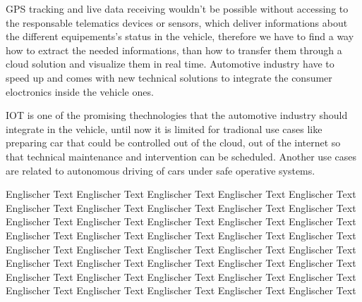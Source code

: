 GPS tracking and live data receiving wouldn't be possible without accessing to the responsable telematics devices or sensors, which deliver informations about the different equipements's status in the vehicle, therefore we have to find a way how to extract the needed informations, than how to transfer them through a cloud solution and visualize them in real time.
Automotive industry have to speed up and comes with new technical solutions to integrate the consumer eloctronics inside the vehicle ones.

IOT is one of the promising thechnologies that the automotive industry should integrate in the vehicle, until now it is limited for tradional use cases like preparing car that could be controlled out of the cloud, out of the internet so that technical maintenance and intervention can be scheduled. Another use cases are related to autonomous driving of cars under safe operative systems.

 

        Englischer Text Englischer Text Englischer Text Englischer Text Englischer Text Englischer Text Englischer Text Englischer Text             
        Englischer Text Englischer Text Englischer Text Englischer Text Englischer Text Englischer Text Englischer Text Englischer Text 
        Englischer Text Englischer Text Englischer Text Englischer Text Englischer Text Englischer Text Englischer Text Englischer Text 
        Englischer Text Englischer Text Englischer Text Englischer Text Englischer Text Englischer Text Englischer Text Englischer Text 
        Englischer Text Englischer Text Englischer Text Englischer Text Englischer Text Englischer Text Englischer Text Englischer Text
        